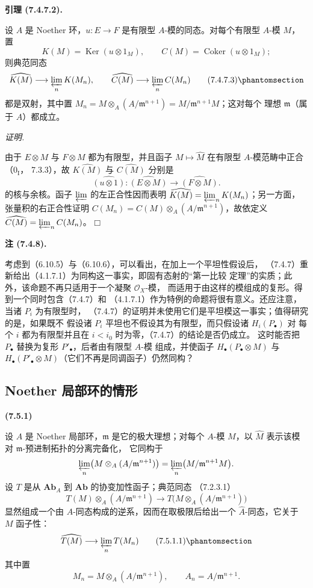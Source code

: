 \documentclass[UTF8,fontset=none,11pt,oneside,openany]{ctexbook}
\providecommand{\square}{\mdlgwhtsquare}
\newenvironment{env}[1][]{%
  \par\medskip\noindent\textbf{(#1)}\ %
}{\par}
\newenvironment{lemma}[1][]{%
  \par\medskip\noindent\textbf{引理 (#1).}\ %
}{\par}
\newenvironment{remark}[1][]{%
  \par\medskip\noindent\textbf{注 (#1).}\ %
}{\par}
\newenvironment{proof}{%
  \par\smallskip\noindent\textit{证明.}\ %
}{\hfill$\square$\par}
\newcommand{\oldpage}[2][]{%
  \hypertarget{ega-source-page-#1-#2}{}%
  \marginnote{\scriptsize\textbf{#1}~|~#2}\ignorespaces}
\let\EGAOriginalLabel\label
\renewcommand{\label}[1]{\phantomsection\EGAOriginalLabel{#1}}
\begin{document}
\begin{lemma}[7.4.7.2]
设 $A$ 是 Noether 环，$u:E\to F$ 是有限型 $A$-模的同态。对每个有限型
$A$-模 $M$，置
\[
  K(M)=\operatorname{Ker}(u\otimes1_M),
  \qquad
  C(M)=\operatorname{Coker}(u\otimes1_M);
\]
则典范同态
\[
  \widehat{K(M)}\longrightarrow\varprojlim_n K(M_n),
  \qquad
  \widehat{C(M)}\longrightarrow\varprojlim_n C(M_n)
  \tag{7.4.7.3}\label{III.7.4.7.3.fr}
\]
都是双射，其中置
$M_n=M\otimes_A(A/\mathfrak m^{n+1})=M/\mathfrak m^{n+1}M$；这对每个
理想 $\mathfrak m$（属于 $A$）都成立。
\end{lemma}

\begin{proof}
由于 $E\otimes M$ 与 $F\otimes M$ 都为有限型，并且函子
$M\mapsto\widehat M$ 在有限型 $A$-模范畴中正合（$0_{\mathrm I}$，
7.3.3），故 $\widehat{K(M)}$ 与 $\widehat{C(M)}$ 分别是
\[
  \widehat{(u\otimes1)}:
  \widehat{(E\otimes M)}\longrightarrow\widehat{(F\otimes M)}.
\]
的核与余核。函子 $\varprojlim$ 的左正合性因而表明
$\widehat{K(M)}=\varprojlim_n K(M_n)$；另一方面，张量积的右正合性证明
$C(M_n)=C(M)\otimes_A(A/\mathfrak m^{n+1})$，故依定义
$\widehat{C(M)}=\varprojlim_n C(M_n)$。
\end{proof}

\begin{remark}[7.4.8]
考虑到（6.10.5）与（6.10.6），可以看出，在加上一个平坦性假设后，
（7.4.7）重新给出（4.1.7.1）为同构这一事实，即固有态射的“第一比较
定理”的实质；此外，该命题不再只适用于一个凝聚 $\mathscr O_X$-模，
而适用于由这样的模组成的复形。得到一个同时包含（7.4.7）和
（4.1.7.1）作为特例的命题将很有意义。还应注意，当诸 $P_i$ 为有限型时，
（7.4.7）的证明并未使用它们是平坦模这一事实；值得研究的是，如果既不
假设诸 $P_i$ 平坦也不假设其为有限型，而只假设诸 $H_i(P_\bullet)$ 对
每个 $i$ 都为有限型并且在 $i<i_0$ 时为零，（7.4.7）的结论是否仍成立。
这时能否把 $P_\bullet$ 替换为复形 $P'_\bullet$，后者由有限型 $A$-模
组成，并使函子 $H_\bullet(P_\bullet\otimes M)$ 与
$H_\bullet(P'_\bullet\otimes M)$（它们不再是同调函子）仍然同构？
\end{remark}

\oldpage[III]{190}

\subsection{Noether 局部环的情形}
\label{subsection:III.7.5.fr}

\begin{env}[7.5.1]
设 $A$ 是 Noether 局部环，$\mathfrak m$ 是它的极大理想；对每个 $A$-模
$M$，以 $\widehat M$ 表示该模对 $\mathfrak m$-预进制拓扑的分离完备化，
它同构于
\[
  \varprojlim_n\bigl(M\otimes_A(A/\mathfrak m^{n+1})\bigr)
  =
  \varprojlim_n\bigl(M/\mathfrak m^{n+1}M\bigr).
\]
设 $T$ 是从 $\mathbf{Ab}_A$ 到 $\mathbf{Ab}$ 的协变加性函子；典范同态
（7.2.3.1）
\[
  T(M)\otimes_A(A/\mathfrak m^{n+1})
  \longrightarrow
  T\bigl(M\otimes_A(A/\mathfrak m^{n+1})\bigr)
\]
显然组成一个由 $A$-同态构成的逆系，因而在取极限后给出一个
$\widehat A$-同态，它关于 $M$ 函子性：
\[
  \widehat{T(M)}
  \longrightarrow
  \varprojlim_n T(M_n)
  \tag{7.5.1.1}\label{III.7.5.1.1.fr}
\]
其中置
\[
  M_n=M\otimes_A(A/\mathfrak m^{n+1}),
  \qquad
  A_n=A/\mathfrak m^{n+1}.
\]
\end{env}
\end{document}
